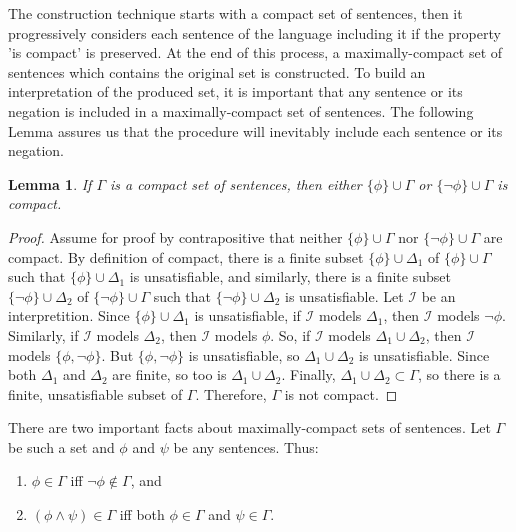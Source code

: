 \documentclass[12pt]{article}
\newtheorem{lemma}[theorem]{Lemma}
\theoremstyle{definition}
\theoremstyle{remark}
\begin{document}
The construction technique starts with a compact set of sentences, then it progressively considers each sentence of the language including it if the property 'is compact' is preserved. At the end of this process, a maximally-compact set of sentences which contains the original set is constructed. To build an interpretation of the produced set, it is important that any sentence or its negation is included in a maximally-compact set of sentences. The following Lemma assures us that the procedure will inevitably include each sentence or its negation.

\begin{lemma}
	\label{lem:either-or-compact}
	If $\Gamma$ is a compact set of sentences, then either $\{ \phi \} \cup \Gamma$ or $\{ \neg\phi \} \cup \Gamma$ is compact.
\end{lemma}

\begin{proof}
	Assume for proof by contrapositive that neither $\{ \phi \} \cup \Gamma$ nor $\{ \neg\phi \} \cup \Gamma$ are compact. By definition of compact, there is a finite subset $\{ \phi \} \cup \Delta_1$ of $\{ \phi \} \cup \Gamma $ such that $\{ \phi \} \cup \Delta_1$ is unsatisfiable, and similarly, there is a finite subset $\{ \neg\phi \} \cup \Delta_2$ of $\{ \neg\phi \} \cup \Gamma$ such that $\{ \neg\phi \} \cup \Delta_2$ is unsatisfiable. Let $\mathscr{I}$ be an interpretition. Since $\{ \phi \} \cup \Delta_1$ is unsatisfiable, if $\mathscr{I}$ models $\Delta_1$, then $\mathscr{I}$ models $\neg\phi$. Similarly, if $\mathscr{I}$ models $\Delta_2$, then $\mathscr{I}$ models $\phi$. So, if $\mathscr{I}$ models $\Delta_1 \cup \Delta_2$, then $\mathscr{I}$ models $\{ \phi, \neg\phi \}$. But $\{ \phi, \neg\phi \}$ is unsatisfiable, so $\Delta_1 \cup \Delta_2$ is unsatisfiable. Since both $\Delta_1$ and $\Delta_2$ are finite, so too is $\Delta_1 \cup \Delta_2$. Finally, $\Delta_1 \cup \Delta_2 \subset \Gamma$, so there is a finite, unsatisfiable subset of $\Gamma$. Therefore, $\Gamma$ is not compact.
\end{proof}

There are two important facts about maximally-compact sets of sentences. Let $\Gamma$ be such a set and $\phi$ and $\psi$ be any sentences. Thus:

\begin{enumerate}
	\item[(1)] $\phi \in \Gamma$ iff $\neg\phi \not\in \Gamma$, and
	\item[(2)] $(\phi \land \psi) \in \Gamma$ iff both $\phi \in \Gamma$ and $\psi \in \Gamma$.
\end{enumerate}
\end{document}
